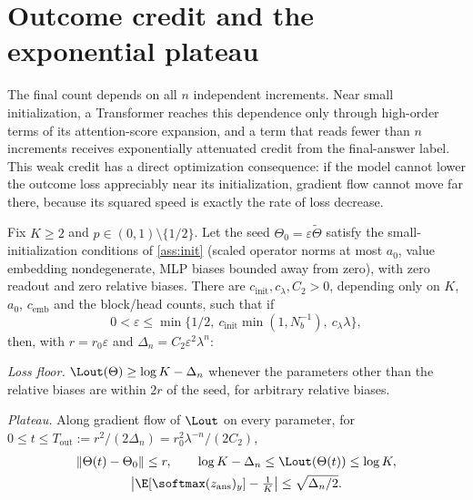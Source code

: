 \section{Outcome credit and the exponential plateau}\label{sec:credit}\label{sec:outcome}
The final count depends on all $n$ independent increments. Near small initialization, a Transformer reaches this dependence only through high-order terms of its attention-score expansion, and a term that reads fewer than $n$ increments receives exponentially attenuated credit from the final-answer label. This weak credit has a direct optimization consequence: if the model cannot lower the outcome loss appreciably near its initialization, gradient flow cannot move far there, because its squared speed is exactly the rate of loss decrease.

\begin{theorem}\label{thm:outcome}\label{thm:outcome-end}
Fix $K\ge2$ and $p\in(0,1)\setminus\{1/2\}$. Let the seed $\Theta_0=\varepsilon\tilde\Theta$ satisfy the small-initialization conditions of \cref{ass:init} (scaled operator norms at most $a_0$, value embedding nondegenerate, MLP biases bounded away from zero), with zero readout and zero relative biases. There are $c_{\mathrm{init}},c_\lambda,C_2>0$, depending only on $K$, $a_0$, $c_{\mathrm{emb}}$ and the block/head counts, such that if
\begin{equation}\label{eq:small}
0<\varepsilon\le\min\{1/2,\ c_{\mathrm{init}}\min(1,N_b^{-1}),\ c_\lambda\lambda\},
\end{equation}
then, with $r=r_0\varepsilon$ and $\Delta_n=C_2\varepsilon^2\lambda^n$:
\begin{thmparts}
\item \emph{Loss floor.} $\Lout(\Theta)\ge\log K-\Delta_n$ whenever the parameters other than the relative biases are within $2r$ of the seed, for arbitrary relative biases.
\item \emph{Plateau.} Along gradient flow of $\Lout$ on every parameter, for $0\le t\le T_{\mathrm{out}}:=r^2/(2\Delta_n)=r_0^2\lambda^{-n}/(2C_2)$,
\begin{equation}\label{eq:plateau}
\begin{gathered}
\|\Theta(t)-\Theta_0\|\le r,\qquad
\log K-\Delta_n\le\Lout(\Theta(t))\le\log K,\\
\bigl|\E[\softmax(z_{\mathrm{ans}})_y]-\tfrac1K\bigr|\le\sqrt{\Delta_n/2}.
\end{gathered}
\end{equation}
\end{thmparts}
\end{theorem}

